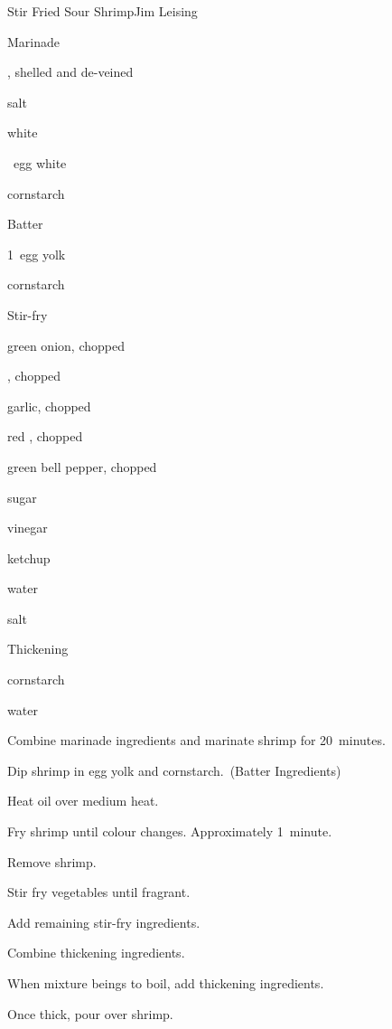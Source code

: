 \begin{recipe}{Stir Fried Sour Shrimp}{Jim Leising}{}

Marinade
\begin{ingredients}
\item \lbs{\twothird} , shelled and de-veined
\item \tp{\quarter} salt
\item \tp{\half} white 
\item \half~egg white
\item {} cornstarch
\end{ingredients}

Batter
\begin{ingredients}
\item 1~egg yolk
\item \Tp{1\half} cornstarch
\end{ingredients}

Stir-fry
\begin{ingredients}
\item \Tp{\half} green onion, chopped
\item \Tp{\half} , chopped
\item \Tp{\half} garlic, chopped
\item \Tp{\half} red , chopped
\item {} green bell pepper, chopped
\item {} sugar
\item {} vinegar
\item {} ketchup
\item {} water
\item \tp{\quarter} salt
\end{ingredients}

Thickening
\begin{ingredients}
\item \tp{\half} cornstarch
\item \Tp{\half} water
\end{ingredients}

\begin{directions}
\item Combine marinade ingredients and marinate shrimp for 20~minutes.
\item Dip shrimp in egg yolk and cornstarch.~(Batter Ingredients)
\item Heat oil over medium heat.
\item Fry shrimp until colour changes. Approximately 1~minute.
\item Remove shrimp.
\item Stir fry vegetables until fragrant.
\item Add remaining stir-fry ingredients.
\item Combine thickening ingredients.
\item When mixture beings to boil, add thickening ingredients.
\item Once thick, pour over shrimp.
\end{directions}

\end{recipe}
